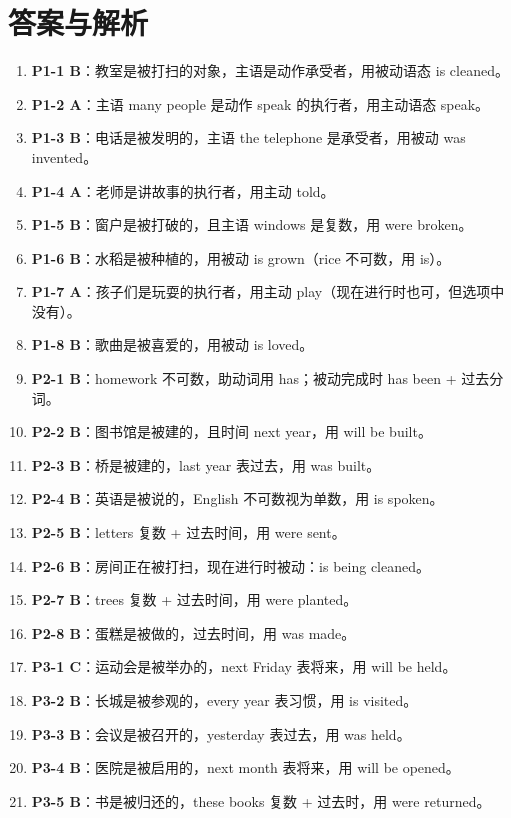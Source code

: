 \documentclass[11pt,a4paper]{ctexart}
\begin{document}
\section*{答案与解析}
\small
\begin{enumerate}[leftmargin=1.6em,itemsep=2pt]
\item \textbf{P1-1 B}：教室是被打扫的对象，主语是动作承受者，用被动语态 is cleaned。
\item \textbf{P1-2 A}：主语 many people 是动作 speak 的执行者，用主动语态 speak。
\item \textbf{P1-3 B}：电话是被发明的，主语 the telephone 是承受者，用被动 was invented。
\item \textbf{P1-4 A}：老师是讲故事的执行者，用主动 told。
\item \textbf{P1-5 B}：窗户是被打破的，且主语 windows 是复数，用 were broken。
\item \textbf{P1-6 B}：水稻是被种植的，用被动 is grown（rice 不可数，用 is）。
\item \textbf{P1-7 A}：孩子们是玩耍的执行者，用主动 play（现在进行时也可，但选项中没有）。
\item \textbf{P1-8 B}：歌曲是被喜爱的，用被动 is loved。
\item \textbf{P2-1 B}：homework 不可数，助动词用 has；被动完成时 has been + 过去分词。
\item \textbf{P2-2 B}：图书馆是被建的，且时间 next year，用 will be built。
\item \textbf{P2-3 B}：桥是被建的，last year 表过去，用 was built。
\item \textbf{P2-4 B}：英语是被说的，English 不可数视为单数，用 is spoken。
\item \textbf{P2-5 B}：letters 复数 + 过去时间，用 were sent。
\item \textbf{P2-6 B}：房间正在被打扫，现在进行时被动：is being cleaned。
\item \textbf{P2-7 B}：trees 复数 + 过去时间，用 were planted。
\item \textbf{P2-8 B}：蛋糕是被做的，过去时间，用 was made。
\item \textbf{P3-1 C}：运动会是被举办的，next Friday 表将来，用 will be held。
\item \textbf{P3-2 B}：长城是被参观的，every year 表习惯，用 is visited。
\item \textbf{P3-3 B}：会议是被召开的，yesterday 表过去，用 was held。
\item \textbf{P3-4 B}：医院是被启用的，next month 表将来，用 will be opened。
\item \textbf{P3-5 B}：书是被归还的，these books 复数 + 过去时，用 were returned。

\end{enumerate}
\end{document}
